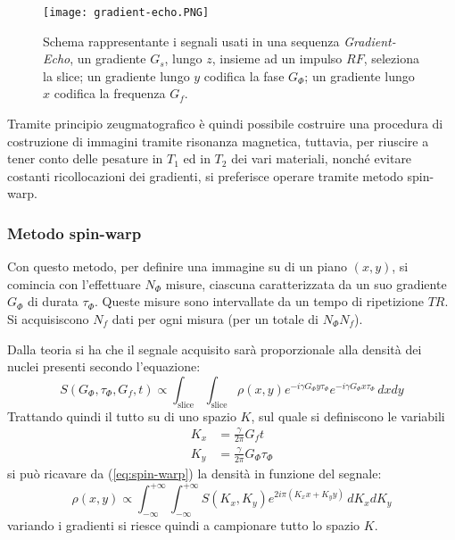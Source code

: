 \begin{figure}
\centering
\texttt{[image: gradient-echo.PNG]}
\caption{Schema rappresentante i segnali usati in una sequenza \textit{Gradient-Echo}, un gradiente $G_s$, lungo $z$, insieme ad un impulso $RF$, seleziona la slice; un gradiente lungo $y$ codifica la fase $G_\Phi$; un gradiente lungo $x$ codifica la frequenza $G_f$.}
\end{figure}

Tramite principio zeugmatografico è quindi possibile costruire una procedura di costruzione di immagini tramite risonanza magnetica, tuttavia, per riuscire a tener conto delle pesature in $T_1$ ed in $T_2$ dei vari materiali, nonché evitare costanti ricollocazioni dei gradienti, si preferisce operare tramite metodo spin-warp.

\subsubsection*{Metodo spin-warp}

Con questo metodo, per definire una immagine su di un piano $(x,y)$, si comincia con l'effettuare $N_{\Phi}$ misure, ciascuna caratterizzata da un suo gradiente $G_{\Phi}$ di durata $\tau_{\Phi}$. Queste misure sono intervallate da un tempo di ripetizione $TR$. Si acquisiscono $N_f$ dati per ogni misura (per un totale di $N_{\Phi}N_f$).

Dalla teoria si ha che il segnale acquisito sarà proporzionale alla densità dei nuclei presenti secondo l'equazione:
\begin{equation}
	S(G_{\Phi}, \tau_{\Phi}, G_f, t) \propto \int_{\text{slice}}\int_{\text{slice}} \rho(x,y) e^{-i\gamma G_\Phi y \tau_\Phi}e^{-i\gamma G_\Phi x \tau_\Phi} \, dxdy
	\label{eq:spin-warp}
\end{equation}
Trattando quindi il tutto su di uno spazio $K$, sul quale si definiscono le variabili
\begin{align}
	K_x &= \frac{\gamma}{2\pi}G_f t \\
	K_y &= \frac{\gamma}{2\pi}G_\Phi \tau_\Phi
\end{align}
si può ricavare da (\ref{eq:spin-warp}) la densità in funzione del segnale:
\begin{equation}
	\rho(x,y) \propto \int_{-\infty}^{+\infty}\int_{-\infty}^{+\infty} S(K_x,K_y) e^{2i\pi(K_x x +K_y y)}\, dK_x dK_y
\end{equation}
variando i gradienti si riesce quindi a campionare tutto lo spazio $K$.

